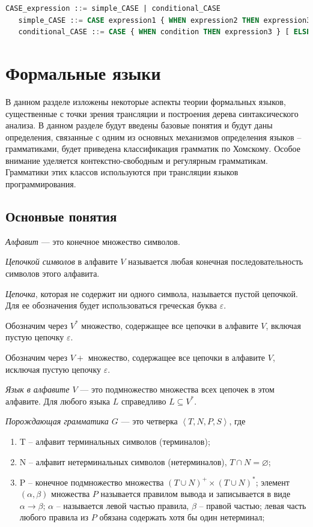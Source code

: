 \begin{lstlisting}[language=sql, label=some-code, caption=Спецификация SQL запроса]
   CASE_expression ::= simple_CASE | conditional_CASE
   simple_CASE ::= CASE expression1 { WHEN expression2 THEN expression3 } [ ELSE expression4 ] END
   conditional_CASE ::= CASE { WHEN condition THEN expression3 } [ ELSE expression4 ] END
\end{lstlisting}

\section{Формальные языки}

В данном разделе изложены некоторые аспекты теории формальных языков, существенные с точки зрения трансляции и построения дерева синтаксического анализа. 
В данном разделе будут введены базовые понятия и будут даны определения, связанные с одним из основных механизмов определения языков -- грамматиками, будет приведена
 классификация грамматик по Хомскому.
Особое внимание уделяется контекстно-свободным и регулярным грамматикам. 
Грамматики этих классов используются при трансляции языков программирования. 

\subsection{Оснонвые понятия}

\textit{Алфавит} — это конечное множество символов.

\textit{Цепочкой символов} в алфавите $V$ называется любая конечная последовательность символов этого алфавита.

\textit{Цепочка}, которая не содержит ни одного символа, называется пустой цепочкой. 
Для ее обозначения будет использоваться греческая буква $\varepsilon$.

Обозначим через $V^{*}$ множество, содержащее все цепочки в алфавите
$V$, включая пустую цепочку $\varepsilon$.

Обозначим через $V{+}$ множество, содержащее все цепочки в алфавите $V$,
исключая пустую цепочку $\varepsilon$.

\textit{Язык в алфавите $V$} — это подмножество множества всех цепочек в этом алфавите. 
Для любого языка $L$ справедливо $L \subseteq V^{*}$.

\textit{Порождающая грамматика $G$} — это четверка $\left\langle {T, N, P, S} \right\rangle$, где
\begin{enumerate}
   \item T -- алфавит терминальных символов (терминалов);
   \item N -- алфавит нетерминальных символов (нетерминалов), $T \cap N = \varnothing$;  
   \item P -- конечное подмножество множества $(T \cup N)^{+} \times (T \cup N)^{*}$; 
   элемент $(\alpha, \beta)$ множества $P$ называется правилом вывода и записывается в виде $\alpha \rightarrow \beta$; 
   $\alpha$ -- называется левой частью правила, 
   $\beta$ -- правой частью; левая часть любого правила из $P$ обязана содержать хотя бы один нетерминал; 
\end{enumerate}

